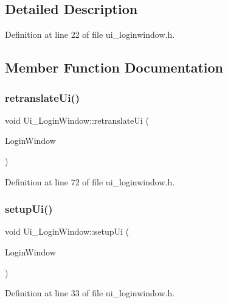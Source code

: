 \subsection{Detailed Description}


Definition at line 22 of file ui\+\_\+loginwindow.\+h.



\subsection{Member Function Documentation}
\mbox{\label{class_ui___login_window_a5f6832fbf9554aef841da1efc1b0fa84}} 
\subsubsection{\texorpdfstring{retranslateUi()}{retranslateUi()}}
{\footnotesize\ttfamily void Ui\+\_\+\+Login\+Window\+::retranslate\+Ui (\begin{DoxyParamCaption}\item[{Q\+Widget $\ast$}]{Login\+Window }\end{DoxyParamCaption})\hspace{0.3cm}{\ttfamily [inline]}}



Definition at line 72 of file ui\+\_\+loginwindow.\+h.

\mbox{\label{class_ui___login_window_a1c3ffc6b9784b68654c59db923f3c217}} 
\subsubsection{\texorpdfstring{setupUi()}{setupUi()}}
{\footnotesize\ttfamily void Ui\+\_\+\+Login\+Window\+::setup\+Ui (\begin{DoxyParamCaption}\item[{Q\+Widget $\ast$}]{Login\+Window }\end{DoxyParamCaption})\hspace{0.3cm}{\ttfamily [inline]}}



Definition at line 33 of file ui\+\_\+loginwindow.\+h.



